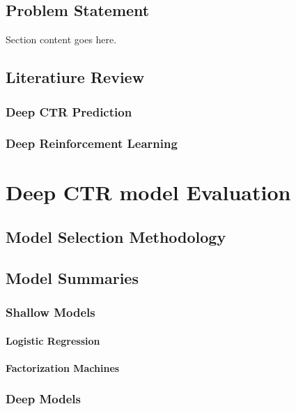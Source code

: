 \documentclass{mldsmsc}
\begin{document}
\section{Problem Statement}

Section content goes here. 

\section{Literatiure Review}

\subsection{Deep CTR Prediction}

\subsection{Deep Reinforcement Learning}

\chapter{Deep CTR model Evaluation}
\label{chap:deep-ctr-model-evaluation}

\section{Model Selection Methodology}

\section{Model Summaries}

\subsection{Shallow Models}

\subsubsection{Logistic Regression}

\subsubsection{Factorization Machines}

\subsection{Deep Models}
\end{document}
